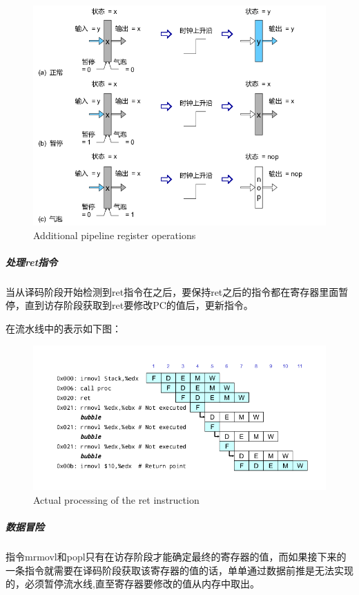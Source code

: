 \documentclass[12pt]{article}
\begin{document}
\begin{CJK*}{GB}{gbsn}
\begin{figure}[htbp]
\centering
\includegraphics{img/eg-pipe-reg-full.png}
\caption{Additional pipeline register operations}
\end{figure}

\subparagraph{处理ret指令}\label{ux5904ux7406retux6307ux4ee4}

当从译码阶段开始检测到ret指令在之后，要保持ret之后的指令都在寄存器里面暂停，直到访存阶段获取到ret要修改PC的值后，更新指令。

在流水线中的表示如下图：

\begin{figure}[htbp]
\centering
\includegraphics{img/prog7.png}
\caption{Actual processing of the ret instruction}
\end{figure}

\subparagraph{数据冒险}\label{ux6570ux636eux5192ux9669-1}

指令mrmovl和popl只有在访存阶段才能确定最终的寄存器的值，而如果接下来的一条指令就需要在译码阶段获取该寄存器的值的话，单单通过数据前推是无法实现的，必须暂停流水线,直至寄存器要修改的值从内存中取出。


\end{CJK*}
\end{document}
